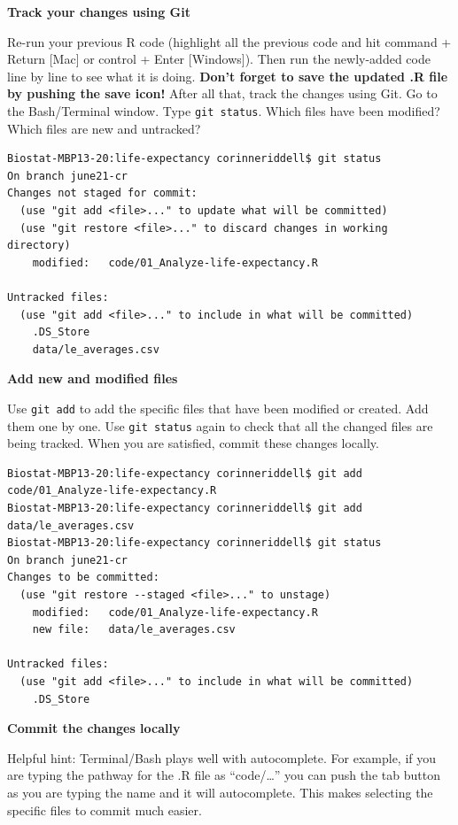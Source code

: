 \documentclass[
]{book}
\begin{document}
\textbf{Track your changes using Git}

Re-run your previous R code (highlight all the previous code and hit
command + Return {[}Mac{]} or control + Enter {[}Windows{]}). Then run the newly-added
code line by line to see what it is doing. \textbf{Don't forget to save the updated
.R file by pushing the save icon!} After all that, track the changes using Git.
Go to the Bash/Terminal window. Type \texttt{git\ status}.
Which files have been modified? Which files are new and untracked?

\begin{verbatim}
Biostat-MBP13-20:life-expectancy corinneriddell$ git status
On branch june21-cr
Changes not staged for commit:
  (use "git add <file>..." to update what will be committed)
  (use "git restore <file>..." to discard changes in working directory)
    modified:   code/01_Analyze-life-expectancy.R

Untracked files:
  (use "git add <file>..." to include in what will be committed)
    .DS_Store
    data/le_averages.csv
\end{verbatim}

\textbf{Add new and modified files}

Use \texttt{git\ add} to add the specific files that have been modified or created.
Add them one by one. Use \texttt{git\ status} again to check that all the changed files
are being tracked. When you are satisfied, commit these changes locally.

\begin{verbatim}
Biostat-MBP13-20:life-expectancy corinneriddell$ git add code/01_Analyze-life-expectancy.R 
Biostat-MBP13-20:life-expectancy corinneriddell$ git add data/le_averages.csv 
Biostat-MBP13-20:life-expectancy corinneriddell$ git status
On branch june21-cr
Changes to be committed:
  (use "git restore --staged <file>..." to unstage)
    modified:   code/01_Analyze-life-expectancy.R
    new file:   data/le_averages.csv

Untracked files:
  (use "git add <file>..." to include in what will be committed)
    .DS_Store
\end{verbatim}

\textbf{Commit the changes locally}

Helpful hint: Terminal/Bash plays well with autocomplete. For example, if you
are typing the pathway for the .R file as ``code/\ldots{}'' you can push the tab button
as you are typing the name and it will autocomplete. This makes selecting the
specific files to commit much easier.
\end{document}

